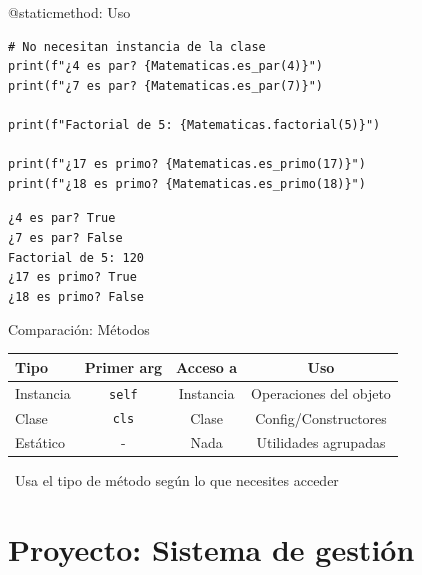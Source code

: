 \documentclass{beamer}
\begin{document}
\begin{frame}[fragile]{@staticmethod: Uso \faCalculator}
\begin{lstlisting}
# No necesitan instancia de la clase
print(f"¿4 es par? {Matematicas.es_par(4)}")
print(f"¿7 es par? {Matematicas.es_par(7)}")

print(f"Factorial de 5: {Matematicas.factorial(5)}")

print(f"¿17 es primo? {Matematicas.es_primo(17)}")
print(f"¿18 es primo? {Matematicas.es_primo(18)}")
\end{lstlisting}

\vspace{-0.2cm}
\begin{tcolorbox}[colback=green!10,colframe=green,title={\small\faArrowCircleRight \ Salida},coltitle=fg0,left=3pt,right=3pt,top=3pt,bottom=3pt,boxsep=2pt]
\small\texttt{¿4 es par? True\\
¿7 es par? False\\
Factorial de 5: 120\\
¿17 es primo? True\\
¿18 es primo? False}
\end{tcolorbox}
\end{frame}

\begin{frame}{Comparación: Métodos \faTable}
\begin{center}
\small
\begin{tabular}{|l|c|c|c|}
\hline
\textbf{Tipo} & \textbf{Primer arg} & \textbf{Acceso a} & \textbf{Uso} \\
\hline
Instancia & \texttt{self} & Instancia & Operaciones del objeto \\
\hline
Clase & \texttt{cls} & Clase & Config/Constructores \\
\hline
Estático & - & Nada & Utilidades agrupadas \\
\hline
\end{tabular}
\end{center}

\vspace{0.3cm}
\begin{notebox}
\small\faInfoCircle\ Usa el tipo de método según lo que necesites acceder
\end{notebox}
\end{frame}

\section{Proyecto: Sistema de gestión}
\end{document}
